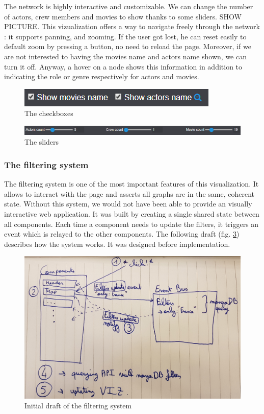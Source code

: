 \documentclass[a4paper,10pt]{article}
\begin{document}
The network is highly interactive and customizable. We can change the number of actors,
crew members and movies to show thanks to some sliders. SHOW PICTURE.
This vizualization offers a way to navigate freely through the network : it supports panning,
and zooming. If the user got lost, he can reset easily to default zoom by pressing a button, no
need to reload the page. Moreover, if we are not interested to having the movies name and actors name shown,
we can turn it off. Anyway, a hover on a node shows this information in addition to
indicating the role or genre respectively for actors and movies.

\begin{figure}[ht]
   \centering
   \includegraphics[width=0.6\linewidth]{images/screens/network-movies-checkboxes.png}
  \caption{The checkboxes} \label{fig:screen-network-movies-checkboxes}
\end{figure}

\begin{figure}[ht]
   \centering
   \includegraphics[width=0.6\linewidth]{images/screens/network-movies-sliders.png}
  \caption{The sliders} \label{fig:screen-network-movies-sliders}
\end{figure}


\subsubsection{The filtering system} \label{sec:filtering-system}

The filtering system is one of the most important features of this visualization.
It allows to interact with the page and asserts all graphs are in the same, coherent
state. Without this system, we would not have been able to provide an visually interactive web application.
It was built by creating a single shared state between all components. Each
time a component needs to update the filters, it triggers an event which is relayed
to the other components. The following draft (fig. \ref{fig:draft-filtering}) describes how the system works. It
was designed before implementation.

\begin{figure}[ht]
   \centering
   \includegraphics[width=0.6\linewidth]{images/drafts/filtering-system.jpg}
  \caption{Initial draft of the filtering system} \label{fig:draft-filtering}
\end{figure}
\end{document}
